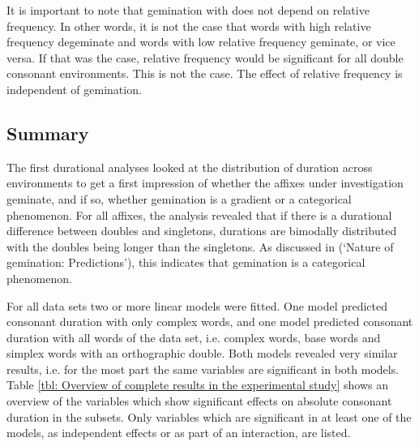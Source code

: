 It is important to note that gemination with  does not depend on relative frequency. In other words, it is not the case that words with high relative frequency degeminate and words with low relative frequency geminate, or vice versa. If that was the case, relative frequency would be significant for all double consonant environments. This is not the case. The effect of relative frequency is independent of gemination. 


\subsection{Summary} \label{discussion experiment}

The first durational analyses looked at the distribution of duration across environments to get a first impression of whether the affixes under investigation geminate, and if so, whether gemination is a gradient or a categorical phenomenon. 
For all affixes,  the analysis revealed that if there is a durational difference between doubles and singletons, durations are bimodally distributed with the doubles being longer than the singletons. As discussed in  (`Nature of gemination: Predictions'), this indicates that gemination is a categorical phenomenon.

For all data sets two or more linear models were fitted. One model predicted consonant duration with only complex words, and one model predicted consonant duration with all words of the data set, i.e. complex words, base words and simplex words with an orthographic double. 
Both models revealed very similar results, i.e. for the most part the same variables are significant in both models.
Table \ref{tbl: Overview of complete results in the experimental study} shows an overview of the variables which show significant effects on absolute consonant duration in the subsets. Only variables which are significant in at least one of the models, as independent effects or as part of an interaction, are listed. 



